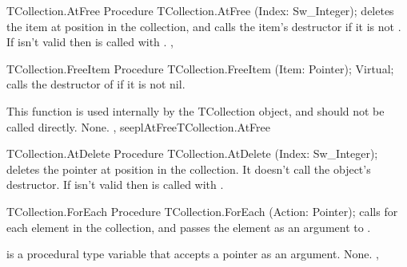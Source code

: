 \html{}

\begin{procedure}{TCollection.AtFree}
\Declaration
Procedure TCollection.AtFree (Index: Sw\_Integer);
\Description
{} deletes the item at position  in the collection,
and calls the item's destructor if it is not . 
\Errors
If  isn't valid then  is called
with .
\SeeAlso
{}, 
\end{procedure}

\html{}


\begin{procedure}{TCollection.FreeItem}
\Declaration
Procedure TCollection.FreeItem (Item: Pointer); Virtual;
\Description
{} calls the destructor of  if it is not nil.

This function is used internally by the TCollection object, and should not be
called directly.
\Errors
None.
\SeeAlso
{}, seepl{AtFree}{TCollection.AtFree}
\end{procedure}


\begin{procedure}{TCollection.AtDelete}
\Declaration
Procedure TCollection.AtDelete (Index: Sw\_Integer);
\Description
{} deletes the pointer at position  in the
collection. It doesn't call the object's destructor.
\Errors
If  isn't valid then  is called
with .
\SeeAlso
{}
\end{procedure}


\html{}

\begin{procedure}{TCollection.ForEach}
\Declaration
Procedure TCollection.ForEach (Action: Pointer);
\Description
{} calls  for each element in the collection,
and passes the element as an argument to .

 is a procedural type variable that accepts a pointer as an 
argument.
\Errors
None.
\SeeAlso
{}, 
\end{procedure}


